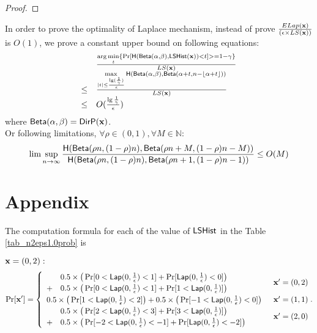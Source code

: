\documentclass{article}
\begin{document}
{\begin{proof}
\end{proof}
\begin{thm}
In order to prove the optimality of Laplace mechanism, instead of prove
$\frac{ELap(\textbf{x})}{(\epsilon \times LS(\textbf{x}))}$ is $O(1)$, we prove a constant upper bound on following equations:
\[
\begin{array}{ll}
	 &	\frac{\arg\min\limits_{t}\{\Pr[\mathsf{H}(\mathsf{Beta}(\alpha, \beta), \mathsf{LSHist}(\textbf{x}))< t] >= 1 - \gamma\}}
	 	{	LS(\textbf{x})	}\\
\leq &	\frac{\max\limits_{|t| \leq \frac{\lg(\frac{1}{\gamma})}{\epsilon}}
		\mathsf{H}(\mathsf{Beta}(\alpha, \beta), \mathsf{Beta}(\alpha + t, n - \lfloor \alpha + t \rfloor))}
		{	LS(\textbf{x})	}\\
\leq & 	O(\frac{\lg{\frac{1}{\gamma}}}{\epsilon})
\end{array}
\]
where $\mathsf{Beta}(\alpha, \beta) = \mathsf{DirP}(\textbf{x}) $.\\
Or following limitations, $\forall \rho \in (0,1), \forall M \in \mathbb{N}$:
\[
\lim\sup\limits_{n \rightarrow \infty} \frac{\mathsf{H}(\mathsf{Beta}(\rho n, (1 - \rho) n), \mathsf{Beta}(\rho n + M, (1 - \rho) n - M))}{\mathsf{H}(\mathsf{Beta}(\rho n, (1 - \rho) n), \mathsf{Beta}(\rho n + 1, (1 - \rho) n - 1))}
\leq O(M)
\]
\end{thm}

\clearpage

\section*{Appendix}
The computation formula for each of the value of $\mathsf{LSHist}$ in the Table \ref{tab_n2eps1.0prob} is

{\scriptsize
\noindent $\textbf{x} = (0,2):$
\[
\Pr[\textbf{x}']
= \begin{cases}
\begin{array}{ll}
 	& 0.5 \times 
 	\big(
 	\Pr[	0	< \mathsf{Lap}(0, \frac{1}{\epsilon})	<	1] 
 	+ 
 	\Pr[	\mathsf{Lap}(0, \frac{1}{\epsilon})			<	0] 
 	\big) \\
 	+ 	
 	& 0.5 \times 
 	\big(
 	\Pr[	0	< \mathsf{Lap}(0, \frac{1}{\epsilon})	<	1] 
 	+ 
 	\Pr[	1 	< \mathsf{Lap}(0, \frac{1}{\epsilon})] 
 	\big) 
\end{array} 
	& \textbf{x}' = (0, 2)\\
\begin{array}{ll}
 	0.5 \times 
 	\big(
 	\Pr[	1	< \mathsf{Lap}(0, \frac{1}{\epsilon})	<	2] 
 	\big)
 	+ 	
 	0.5 \times 
 	\big(
 	\Pr[	-1	< \mathsf{Lap}(0, \frac{1}{\epsilon})	<	0] 
 	\big) 
\end{array}  
	& \textbf{x}' = (1, 1)\\
\begin{array}{ll}
 	& 0.5 \times 
 	\big(
 	\Pr[	2	<	\mathsf{Lap}(0, \frac{1}{\epsilon})	<	3] 
 	+ 
 	\Pr[	3	<	\mathsf{Lap}(0, \frac{1}{\epsilon})]
 	\big) \\
 	+ 	
 	& 0.5 \times 
 	\big(
 	\Pr[	-2	< \mathsf{Lap}(0, \frac{1}{\epsilon})	<	-1] 
 	+ 
 	\Pr[	\mathsf{Lap}(0, \frac{1}{\epsilon})			<	-2] 
 	\big) 
\end{array}  
& \textbf{x}' = (2, 0)
\end{cases}.
\]


}}
\end{document}
